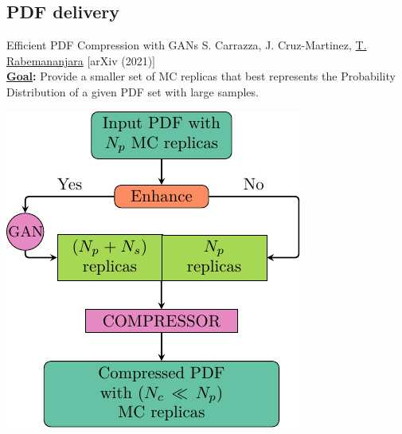 \providecommand{\iRef}[1]{{\tiny\color{HallowGreen} $[$#1$]$}}

\author[Tanjona Rabemananjara]{}

\subsection{PDF delivery}

\begin{frame}{Efficient PDF Compression with GANs}
	S. Carrazza, J. Cruz-Martinez, \underline{T. Rabemananjara} \iRef{arXiv (2021)} \\
	\textbf{\textcolor{HallowGreen}{\underline{Goal}:}} Provide a smaller set of MC 
	replicas that best represents the Probability Distribution of a given PDF set 
	with large samples.
	\vspace*{-0.1cm}	
	\begin{center}
	\includegraphics[height=.7\textheight]{./gan_compressor/imgs/pygans.pdf}
	\end{center}
\end{frame}

